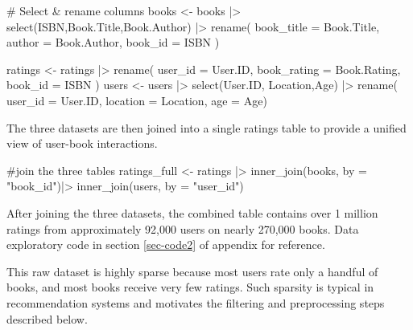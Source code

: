 \documentclass[
  12pt]{article}
\newenvironment{Shaded}{\begin{snugshade}}{\end{snugshade}}
\newcommand{\AttributeTok}[1]{\textcolor[rgb]{0.40,0.45,0.13}{#1}}
\newcommand{\CommentTok}[1]{\textcolor[rgb]{0.37,0.37,0.37}{#1}}
\newcommand{\FunctionTok}[1]{\textcolor[rgb]{0.28,0.35,0.67}{#1}}
\newcommand{\NormalTok}[1]{\textcolor[rgb]{0.00,0.23,0.31}{#1}}
\newcommand{\OtherTok}[1]{\textcolor[rgb]{0.00,0.23,0.31}{#1}}
\newcommand{\SpecialCharTok}[1]{\textcolor[rgb]{0.37,0.37,0.37}{#1}}
\newcommand{\StringTok}[1]{\textcolor[rgb]{0.13,0.47,0.30}{#1}}
\begin{document}
\begin{Shaded}
\begin{Highlighting}[]
\CommentTok{\# Select \& rename columns }
\NormalTok{books }\OtherTok{\textless{}{-}}\NormalTok{ books }\SpecialCharTok{|\textgreater{}} 
         \FunctionTok{select}\NormalTok{(ISBN,Book.Title,Book.Author) }\SpecialCharTok{|\textgreater{}} 
         \FunctionTok{rename}\NormalTok{(}
           \AttributeTok{book\_title =}\NormalTok{ Book.Title,}
           \AttributeTok{author =}\NormalTok{ Book.Author,}
           \AttributeTok{book\_id =}\NormalTok{ ISBN}
\NormalTok{         )}

\NormalTok{ratings }\OtherTok{\textless{}{-}}\NormalTok{ ratings }\SpecialCharTok{|\textgreater{}} 
  \FunctionTok{rename}\NormalTok{(}
    \AttributeTok{user\_id =}\NormalTok{ User.ID,}
    \AttributeTok{book\_rating =}\NormalTok{ Book.Rating,}
    \AttributeTok{book\_id =}\NormalTok{ ISBN}
\NormalTok{  )}
\NormalTok{users }\OtherTok{\textless{}{-}}\NormalTok{ users }\SpecialCharTok{|\textgreater{}}
  \FunctionTok{select}\NormalTok{(User.ID, Location,Age) }\SpecialCharTok{|\textgreater{}} 
  \FunctionTok{rename}\NormalTok{(}
    \AttributeTok{user\_id =}\NormalTok{ User.ID,}
    \AttributeTok{location =}\NormalTok{ Location,}
    \AttributeTok{age =}\NormalTok{ Age)}
\end{Highlighting}
\end{Shaded}

The three datasets are then joined into a single ratings table to
provide a unified view of user-book interactions.

\begin{Shaded}
\begin{Highlighting}[]
\CommentTok{\#join the three tables}
\NormalTok{ratings\_full }\OtherTok{\textless{}{-}}\NormalTok{ ratings }\SpecialCharTok{|\textgreater{}} 
  \FunctionTok{inner\_join}\NormalTok{(books, }
             \AttributeTok{by =} \StringTok{"book\_id"}\NormalTok{)}\SpecialCharTok{|\textgreater{}}  
  \FunctionTok{inner\_join}\NormalTok{(users, }
             \AttributeTok{by =} \StringTok{"user\_id"}\NormalTok{)}
\end{Highlighting}
\end{Shaded}

After joining the three datasets, the combined table contains over 1
million ratings from approximately 92,000 users on nearly 270,000 books.
Data exploratory code in section \ref{sec-code2} of appendix for
reference.

This raw dataset is highly sparse because most users rate only a handful
of books, and most books receive very few ratings. Such sparsity is
typical in recommendation systems and motivates the filtering and
preprocessing steps described below.
\end{document}
